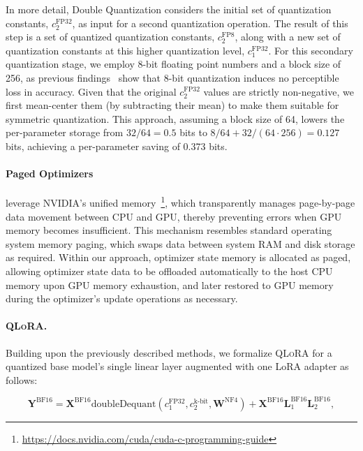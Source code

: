 In more detail, Double Quantization considers the initial set of quantization constants, $c_2^{\text{FP32}}$, as input for a second quantization operation. The result of this step is a set of quantized quantization constants, $c_2^{\text{FP8}}$, along with a new set of quantization constants at this higher quantization level, $c_1^{\text{FP32}}$. For this secondary quantization stage, we employ 8-bit floating point numbers and a block size of 256, as previous findings~\citep{dettmers2022case} show that 8-bit quantization induces no perceptible loss in accuracy. Given that the original $c_2^{\text{FP32}}$ values are strictly non-negative, we first mean-center them (by subtracting their mean) to make them suitable for symmetric quantization. This approach, assuming a block size of 64, lowers the per-parameter storage from $32/64=0.5$ bits to $8/64 + 32/(64\cdot256) = 0.127$ bits, achieving a per-parameter saving of 0.373 bits.

\paragraph{Paged Optimizers} leverage NVIDIA's unified memory~\footnote{\tiny \url{https://docs.nvidia.com/cuda/cuda-c-programming-guide}}, which transparently manages page-by-page data movement between CPU and GPU, thereby preventing errors when GPU memory becomes insufficient. This mechanism resembles standard operating system memory paging, which swaps data between system RAM and disk storage as required. Within our approach, optimizer state memory is allocated as paged, allowing optimizer state data to be offloaded automatically to the host CPU memory upon GPU memory exhaustion, and later restored to GPU memory during the optimizer's update operations as necessary.

\paragraph{\textsc{QLoRA}.} Building upon the previously described methods, we formalize \textsc{QLoRA} for a quantized base model's single linear layer augmented with one LoRA adapter as follows:

\begin{equation}
    \mathbf{Y}^{\text{BF16}} =  \mathbf{X}^{\text{BF16}} \text{doubleDequant}(c_1^{\text{FP32}}, c_2^{\text{k-bit}}, \mathbf{W}^{\text{NF4}}) + \mathbf{X}^{\text{BF16}}\mathbf{L}^{\text{BF16}}_1\mathbf{L}^{\text{BF16}}_2,
\end{equation}

